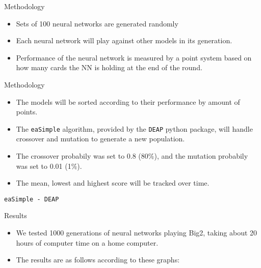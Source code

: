 \documentclass{beamer}
\begin{document}
\begin{frame}{Methodology}
	
	\begin{itemize}
	
		\item Sets of 100 neural networks are generated randomly
		\item Each neural network will play against other models in its generation.
		\item Performance of the neural network is measured by a point system based on how many cards the NN is holding at the end of the round.

	\end{itemize}
	
\end{frame}

\begin{frame}{Methodology}
	
	\begin{itemize}
		
		\item The models will be sorted according to their performance by amount of points.
		\item The \verb|eaSimple| algorithm, provided by the \texttt{DEAP} python package, will handle crossover and mutation to generate a new population.
		\item The crossover probabily was set to 0.8 (80\%), and the mutation probabily was set to 0.01 (1\%).
		\item The mean, lowest and highest score will be tracked over time.
		
	\end{itemize}
	
\end{frame}

\begin{frame}{\texttt{eaSimple - DEAP}}

\end{frame}

\begin{frame}{Results}
	
	\begin{itemize}
		\item We tested 1000 generations of neural networks playing Big2, taking about 20 hours of computer time on a home computer.
		\item The results are as follows according to these graphs:
	\end{itemize}
	
\end{frame}
\end{document}
